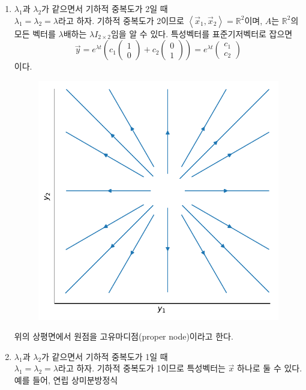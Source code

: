 \documentclass[../engineering_mathematics_lecture_note.tex]{subfiles}
\begin{document}
\begin{enumerate}
\begin{figure}[H]
            \label{fig:plots/saddle_point.pdf}
        \end{figure}
    \item $\lambda_1$과 $\lambda_2$가 같으면서 기하적 중복도가 2일 때\\
        $\lambda_1 = \lambda_2 = \lambda$라고 하자.
        기하적 중복도가 2이므로 $\left< \vec x_1, \vec x_2 \right> = \mathbb R^2$이며, $A$는 $\mathbb R^2$의 모든 벡터를 $\lambda$배하는 $\lambda I_{2 \times 2}$임을 알 수 있다.
        특성벡터를 표준기저벡터로 잡으면
        \begin{equation*}
            \vec y = e^{\lambda t} \left(c_1 \begin{pmatrix}
                1 \\ 0
            \end{pmatrix}
            + c_2 \begin{pmatrix}
                0 \\ 1
        \end{pmatrix}\right) = e^{\lambda t} \begin{pmatrix}
            c_1 \\ c_2
        \end{pmatrix}
        \end{equation*}
        이다.
        \begin{figure}[H]
            \centering
            \includegraphics[width=0.5\linewidth]{plots/proper_node.pdf}
            \label{fig:plots/proper_node.pdf}
        \end{figure}
        위의 상평면에서 원점을 고유마디점(proper node)이라고 한다.
    \item $\lambda_1$과 $\lambda_2$가 같으면서 기하적 중복도가 1일 때\\
        $\lambda_1 = \lambda_2 = \lambda$라고 하자.
        기하적 중복도가 1이므로 특성벡터는 $\vec x$ 하나로 둘 수 있다.
        예를 들어, 연립 상미분방정식

\end{enumerate}
\end{document}
